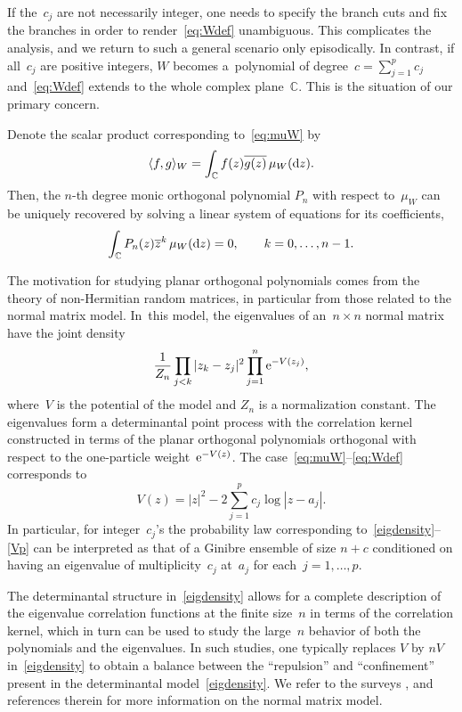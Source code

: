 \documentclass[pdftex]{sigma}
\numberwithin{equation}{section}
\newcommand*{\Cset}{\mathbb{C}} %
\begin{document}
 If the~$c_j$ are not necessarily integer, one needs to specify the branch cuts and fix the branches in order to render~\eqref{eq:Wdef} unambiguous. This complicates the analysis, and we return to such a general scenario only episodically. In contrast, if all~$c_j$ are positive integers, $W$ becomes a~polynomial of degree~$c = \sum_{j=1}^p c_j$ and~\eqref{eq:Wdef} extends to the whole complex plane~$\mathbb{C}$. This is the situation of our primary concern.

 Denote the scalar product corresponding to~\eqref{eq:muW} by
 \begin{equation}
 \label{eq:fgscalar}
 \langle f, g \rangle_W = \int_{\Cset} f(z)\overline{g(z)} \, \mu_W({\rm d}z).
 \end{equation}
 Then, the $n$-th degree monic orthogonal polynomial $P_n$ with
 respect to~$\mu_W$ can be uniquely recovered by solving a linear system of equations for its coefficients,
 \begin{equation}
 \label{def:Pn}
 \int_{\Cset} P_{n}(z)\overline{z}^k\, \mu_W({\rm d}z)=0, \qquad k=0,\dots,n-1.
 \end{equation}

The motivation for studying planar orthogonal polynomials comes from the theory of non-Hermitian random matrices, in particular from those related to the normal matrix model. In~this model, the eigenvalues of an~$n\times n$ normal matrix have the joint density
 \begin{equation}
 \label{eigdensity}
 \frac{1}{Z_n} \prod_{j<k} |z_k-z_j|^2 \prod_{j=1}^n {\rm e}^{-V(z_j)},
 \end{equation}
 where~$V$ is the potential of the model and $Z_n$ is a normalization constant. The eigenvalues form a determinantal point process with the correlation kernel constructed in terms of the planar orthogonal polynomials orthogonal with respect to the one-particle weight~${\rm e}^{-V(z)}$. The case~\eqref{eq:muW}--\eqref{eq:Wdef} corresponds to
 \begin{equation}
 \label{Vp}
 V(z) = |z|^2 - 2 \sum_{j=1}^p c_j \log |z-a_j|.
 \end{equation}
 In particular, for integer~$c_j$'s the probability law corresponding
 to~\eqref{eigdensity}--\eqref{Vp} can be interpreted as that of a Ginibre ensemble
 of size $n+c$ conditioned on having an eigenvalue of
 multiplicity~$c_j$ at~$a_j$ for each~$j=1,\dots,p$.

 The determinantal structure in~\eqref{eigdensity} allows for a complete description of the eigenvalue correlation functions at the finite size~$n$ in terms of the correlation kernel, which in turn can be used to study the large~$n$ behavior of both the polynomials and the eigenvalues. In such studies, one typically replaces $V$ by $nV$ in~\eqref{eigdensity} to obtain a balance between the ``repulsion'' and ``confinement'' present in the determinantal model~\eqref{eigdensity}. We refer to the surveys \cite[Section 5]{BF}, \cite[Chapter 6]{GTV} and references therein for more information on the normal matrix model.
\end{document}
